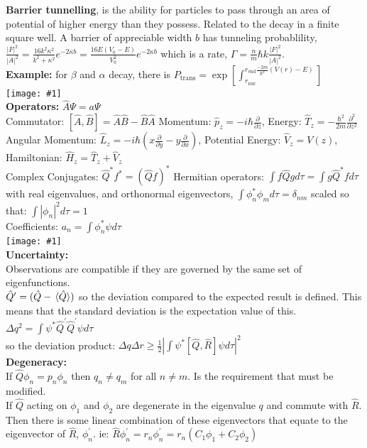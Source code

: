 \documentclass[10pt,landscape,a4paper]{article}
\newcommand{\inlineimage}[1]{\texttt{[image: \#1]}\\}
\newcommand{\minititle}[1]{\textbf{#1:}\\}
\renewcommand{\^}[1]{\ensuremath{\hat{#1}}}
\begin{document}
\begin{multicols}{4}
	\textbf{Barrier tunnelling}, is the ability for particles to pass through an area of potential of higher energy than they possess. Related to the decay in a finite square well. A barrier of appreciable width $ b $ has tunneling probablility,	$ \frac{|F|^2}{|A|^2} = \frac{16k^2\kappa^2}{k^2+\kappa^2}e^{-2\kappa b} = \frac{16E(V_0-E )}{V_0^2}e^{-2\kappa b} $ which is a rate, $ \Gamma = \frac{n}{m}\hbar k \frac{|F|^2}{|A|^2}  $.\\
	\textbf{Example:} for $ \beta $ and $ \alpha $ decay, there is $ P_\text{trans} = \exp\left[\int_{r_\text{nuc}}^{r_\text{end}\frac{-2m}{\hbar^2}(V(r)-E)}\right] $\\
	\inlineimage{barriertunnelex.png}
	\textbf{Operators:}
	$ \hat{A}\Psi = a\Psi $\\
	Commutator: $ [\hat{A},\hat{B}] = \hat{A}\hat{B}-\hat{B}\hat{A} $
	Momentum: $ \hat{p}_z = -i\hbar\frac{\partial}{\partial z} $, Energy: $ \hat{T}_z= -\frac{\hbar^2}{2m}\frac{\partial^2}{\partial z^2} $ Angular Momentum: $ \hat{L}_z = -i\hbar\left(x\frac{\partial}{\partial y}-y\frac{\partial}{\partial x}\right) $, Potential Energy: $ \hat{V}_z = V(z) $, Hamiltonian: $ \hat{H}_z = \hat{T}_z+\hat{V}_z $\\
	Complex Conjugates: $ \hat{Q}^*f^* = \left(\hat{Q}f\right)^* $ Hermitian operators: $ \int f\hat{Q}gd\tau = \int g\hat{Q}^*fd\tau $ with real eigenvalues, and orthonormal eigenvectors, $ 
	\int\phi^*_n\phi_md\tau = \delta_{nm} $ scaled so that: $ \int|\phi_n|^2d\tau = 1 $\\
	Coefficients: $ a_n = \int\phi^*_n\psi d\tau $\\
	\inlineimage{postulates.png}
	\textbf{Uncertainty:}\\
	Observations are compatible if they are governed by the same set of eigenfunctions.\\
	$ \hat{Q}^\prime = (\hat{Q} - \expval*{\hat{Q}}) $ so the deviation compared to the expected result is defined. This means that the standard deviation is the expectation value of this.
	$ \Delta q^2 = \int \psi^*\hat{Q}^\prime\hat{Q}^\prime\psi d\tau $\\
	so the deviation product: $ \Delta q\Delta r \ge \frac{1}{2}\left|\int\psi^*\left[\hat{Q},\hat{R}\right]\psi d \tau\right|^2 $\\
	\minititle{Degeneracy}
	If $ \hat{Q}\phi_n = p_n\phi_n $ then $ q_n\neq q_m $ for all $ n\neq m $. Is the requirement that must be modified.\\
	If $ \hat{Q} $ acting on $ \phi_1 $ and $ \phi_2 $ are degenerate in the eigenvalue $ q $ and commute with $ \hat{R} $. Then there is some linear combination of these eigenvectors that equate to the eigenvector of $ \hat{R} $, $ \phi^\prime_n $. ie: $ \hat{R}\phi^\prime_n = r_n\phi^\prime_n = r_n\left(C_1\phi_1+C_2\phi_2\right) $
	

\end{multicols}
\end{document}
